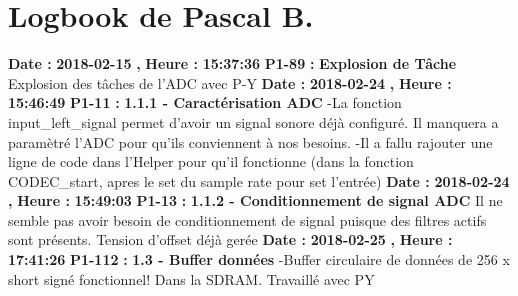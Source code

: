 \documentclass{article}%
\begin{document}
%
\section{Logbook de Pascal B.}%
\textbf{Date : }%
\textbf{2018{-}02{-}15}%
\textbf{,}%
\textbf{ Heure : }%
\textbf{15:37:36}%
\newline%
%
\textbf{P1{-}89 }%
\textbf{ : }%
\textbf{ Explosion de Tâche}%
\newline%
\newline%
%
Explosion des tâches de l'ADC avec P{-}Y\newline%
\newline%
%
\textbf{Date : }%
\textbf{2018{-}02{-}24}%
\textbf{,}%
\textbf{ Heure : }%
\textbf{15:46:49}%
\newline%
%
\textbf{P1{-}11 }%
\textbf{ : }%
\textbf{ 1.1.1 {-} Caractérisation ADC}%
\newline%
\newline%
%
{-}La fonction input\_left\_signal permet d'avoir un signal sonore déjà configuré. Il manquera a paramètré l'ADC pour qu'ils conviennent à nos besoins.\newline%
{-}Il a fallu rajouter une ligne de code dans l'Helper pour qu'il fonctionne (dans la fonction CODEC\_start, apres le set du sample rate pour set l'entrée)\newline%
\newline%
%
\textbf{Date : }%
\textbf{2018{-}02{-}24}%
\textbf{,}%
\textbf{ Heure : }%
\textbf{15:49:03}%
\newline%
%
\textbf{P1{-}13 }%
\textbf{ : }%
\textbf{ 1.1.2 {-} Conditionnement de signal ADC}%
\newline%
\newline%
%
Il ne semble pas avoir besoin de conditionnement de signal puisque des filtres actifs sont présents.\newline%
Tension d'offset déjà gerée\newline%
\newline%
%
\textbf{Date : }%
\textbf{2018{-}02{-}25}%
\textbf{,}%
\textbf{ Heure : }%
\textbf{17:41:26}%
\newline%
%
\textbf{P1{-}112 }%
\textbf{ : }%
\textbf{ 1.3 {-} Buffer données}%
\newline%
\newline%
%
{-}Buffer circulaire de données de 256 x short signé fonctionnel! Dans la SDRAM. Travaillé avec PY\newline%
\newline%
%
\newpage
\end{document}
